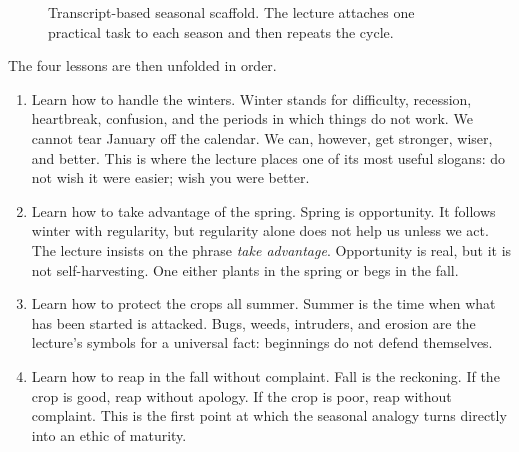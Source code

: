 \begin{figure}[t]
\centering
{}
\caption{Transcript-based seasonal scaffold. The lecture attaches one practical task to each season and then repeats the cycle.}
\end{figure}

The four lessons are then unfolded in order.

\begin{enumerate}
\item Learn how to handle the winters. Winter stands for difficulty, recession, heartbreak, confusion, and the periods in which things do not work. We cannot tear January off the calendar. We can, however, get stronger, wiser, and better. This is where the lecture places one of its most useful slogans: do not wish it were easier; wish you were better.

\item Learn how to take advantage of the spring. Spring is opportunity. It follows winter with regularity, but regularity alone does not help us unless we act. The lecture insists on the phrase \emph{take advantage}. Opportunity is real, but it is not self-harvesting. One either plants in the spring or begs in the fall.

\item Learn how to protect the crops all summer. Summer is the time when what has been started is attacked. Bugs, weeds, intruders, and erosion are the lecture's symbols for a universal fact: beginnings do not defend themselves.

\item Learn how to reap in the fall without complaint. Fall is the reckoning. If the crop is good, reap without apology. If the crop is poor, reap without complaint. This is the first point at which the seasonal analogy turns directly into an ethic of maturity.
\end{enumerate}

